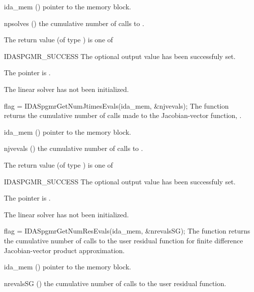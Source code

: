 {
  \begin{args}[npsolves]
  \item[ida\_mem] ()
    pointer to the {\ida} memory block.
  \item[npsolves] ()
    the cumulative number of calls to .
  \end{args}
}
{
  The return value  (of type ) is one of
  \begin{args}
  \item[IDASPGMR\_SUCCESS] 
    The optional output value has been successfuly set.
  \item[\Id{IDASPGMR\_MEM\_NULL}]
    The  pointer is .
  \item[\Id{IDASPGMR\_LMEM\_NULL}]
    The {\idaspgmr} linear solver has not been initialized.
  \end{args}
}
{}
{
  flag = IDASpgmrGetNumJtimesEvals(ida\_mem, \&njvevals);
}
{
  The function  returns the
  cumulative number of calls made to the Jacobian-vector function,
  .
}
{
  \begin{args}[njvevals]
  \item[ida\_mem] ()
    pointer to the {\ida} memory block.
  \item[njvevals] ()
    the cumulative number of calls to .
  \end{args}
}
{
  The return value  (of type ) is one of
  \begin{args}
  \item[IDASPGMR\_SUCCESS] 
    The optional output value has been successfuly set.
  \item[\Id{IDASPGMR\_MEM\_NULL}]
    The  pointer is .
  \item[\Id{IDASPGMR\_LMEM\_NULL}]
    The {\idaspgmr} linear solver has not been initialized.
  \end{args}
}
{}
{
  flag = IDASpgmrGetNumResEvals(ida\_mem, \&nrevalsSG);
}
{
  The function  returns the
  cumulative number of calls to the user residual function for
  finite difference Jacobian-vector product approximation.
}
{
  \begin{args}[nrevalsSG]
  \item[ida\_mem] ()
    pointer to the {\ida} memory block.
  \item[nrevalsSG] ()
    the cumulative number of calls to the user residual function.
  \end{args}
}
